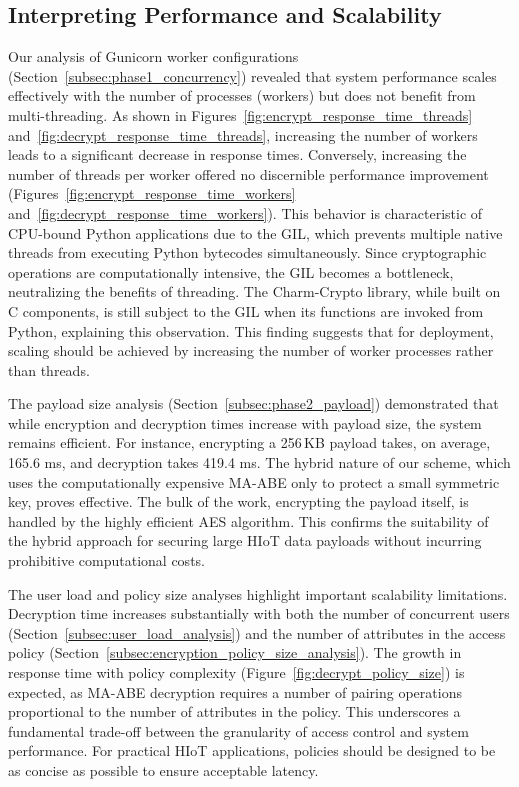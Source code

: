 \documentclass[cic,tc,english]{iiufrgs}
\numberwithin{algorithm}{chapter}
\begin{document}
            \subsection{Interpreting Performance and Scalability}

                Our analysis of Gunicorn worker configurations (Section~\ref{subsec:phase1_concurrency}) revealed that system performance scales effectively with the number of processes (workers) but does not benefit from multi-threading. As shown in Figures~\ref{fig:encrypt_response_time_threads} and~\ref{fig:decrypt_response_time_threads}, increasing the number of workers leads to a significant decrease in response times. Conversely, increasing the number of threads per worker offered no discernible performance improvement (Figures~\ref{fig:encrypt_response_time_workers} and~\ref{fig:decrypt_response_time_workers}). This behavior is characteristic of CPU-bound Python applications due to the GIL, which prevents multiple native threads from executing Python bytecodes simultaneously. Since cryptographic operations are computationally intensive, the GIL becomes a bottleneck, neutralizing the benefits of threading. The Charm-Crypto library, while built on C components, is still subject to the GIL when its functions are invoked from Python, explaining this observation. This finding suggests that for deployment, scaling should be achieved by increasing the number of worker processes rather than threads.

                The payload size analysis (Section~\ref{subsec:phase2_payload}) demonstrated that while encryption and decryption times increase with payload size, the system remains efficient. For instance, encrypting a 256\,KB payload takes, on average, 165.6 ms, and decryption takes 419.4 ms. The hybrid nature of our scheme, which uses the computationally expensive MA-ABE only to protect a small symmetric key, proves effective. The bulk of the work, encrypting the payload itself, is handled by the highly efficient AES algorithm. This confirms the suitability of the hybrid approach for securing large HIoT data payloads without incurring prohibitive computational costs.

                The user load and policy size analyses highlight important scalability limitations. Decryption time increases substantially with both the number of concurrent users (Section~\ref{subsec:user_load_analysis}) and the number of attributes in the access policy (Section~\ref{subsec:encryption_policy_size_analysis}). The growth in response time with policy complexity (Figure~\ref{fig:decrypt_policy_size}) is expected, as MA-ABE decryption requires a number of pairing operations proportional to the number of attributes in the policy. This underscores a fundamental trade-off between the granularity of access control and system performance. For practical HIoT applications, policies should be designed to be as concise as possible to ensure acceptable latency.
\end{document}
